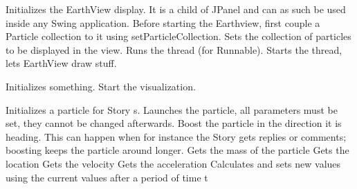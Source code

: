 \begin{interface}
    {Initializes the EarthView display. It is a child of JPanel and can as such
    be used inside any Swing application. Before starting the Earthview, first
    couple a Particle collection to it using setParticleCollection.}
    {Sets the collection of particles to be displayed in the view.}
    {Runs the thread (for Runnable).}
    {Starts the thread, lets EarthView draw stuff.}
\end{interface}





\begin{classmetadata}
\end{classmetadata}

\begin{interface}
    {Initializes something.}
    {Start the visualization.}
    {}
\end{interface}





\begin{classmetadata}
\end{classmetadata}

\begin{interface}
    {Initializes a particle for Story s.}
    {Launches the particle, all parameters must be set, they cannot be changed
      afterwards.}
    {Boost the particle in the direction it is heading. This can happen when
      for instance the Story gets replies or comments; boosting keeps the
      particle around longer.}
    {Gets the mass of the particle}
    {Gets the location}
    {Gets the velocity}
    {Gets the acceleration}
    {Calculates and sets new values using the current values after a period of
      time t}
\end{interface}

